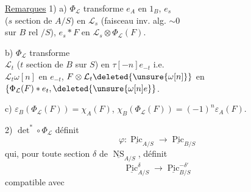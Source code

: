 \uline{Remarques} 1) a) $\Phi_{\mathcal L}$ transforme $e_A$ en $1_B$, $e_s$\\
($s$ section de $A/S$) en $\mathcal L_s$ (faisceau inv. alg. $\sim0$\\
sur $B$ rel $/S$),  $e_s*F$ en $\mathcal L_s\otimes\Phi_{\mathcal L}(F)$.

b) $\Phi_{\mathcal L}$ transforme \\
$\mathcal L_t$ ($t$ section de $B$ sur $S$) en $\tau[-n]e_{-t}$ i.e.\\
$\mathcal L_t\omega[n]$ en $e_{-t}$,  $F\otimes\mathcal L_t\deleted{\unsure{\omega[n]}}$ en $\{\Phi_{\mathcal L}(F)*e_t,\deleted{\unsure{\omega[n]e}}$.

c) $\varepsilon_B(\Phi_{\mathcal L}(F))=\chi_A(F)$, $\chi_B(\Phi_{\mathcal L}(F))=(-1)^n\varepsilon_A(F)$.

2) $\det^*\circ\Phi_{\mathcal L}$ définit 
\[
\varphi:\underline{\operatorname{Pic}}_{A/S}\longrightarrow\underline{\operatorname{Pic}}_{B/S}
\]
qui, pour toute section $\delta$ de $\underline{\operatorname{NS}}_{A/S}$, définit
\[
\underline{\operatorname{Pic}}^\delta_{A/S}\longrightarrow\underline{\operatorname{Pic}}^{-\delta'}_{B/S}
\]
compatible avec

